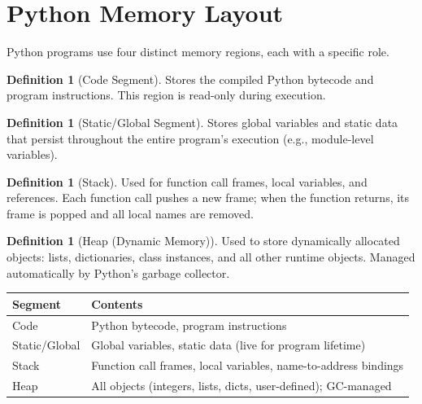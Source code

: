 \documentclass[11pt, a4paper, notitlepage]{report}
\theoremstyle{definition}
\newtheorem{definition}[theorem]{Definition}
\theoremstyle{remark}
\theoremstyle{definition}
\begin{document}
\section{Python Memory Layout}
\label{sec:memory-layout}

Python programs use four distinct memory regions, each with a specific role.

\begin{definition}[Code Segment]
Stores the compiled Python bytecode and program instructions. This region is read-only during
execution.
\end{definition}

\begin{definition}[Static/Global Segment]
Stores global variables and static data that persist throughout the entire program's
execution (e.g., module-level variables).
\end{definition}

\begin{definition}[Stack]
Used for function call frames, local variables, and references. Each function call pushes a
new frame; when the function returns, its frame is popped and all local names are removed.
\end{definition}

\begin{definition}[Heap (Dynamic Memory)]
Used to store dynamically allocated objects: lists, dictionaries, class instances, and all
other runtime objects. Managed automatically by Python's garbage collector.
\end{definition}

\begin{keyresult}[title={Memory Layout Summary}]
\begin{center}
\begin{tabularx}{\linewidth}{lX}
\toprule
\textbf{Segment} & \textbf{Contents} \\
\midrule
Code & Python bytecode, program instructions \\
Static/Global & Global variables, static data (live for program lifetime) \\
Stack & Function call frames, local variables, name-to-address bindings \\
Heap & All objects (integers, lists, dicts, user-defined); GC-managed \\
\bottomrule
\end{tabularx}
\end{center}
\end{keyresult}
\end{document}
